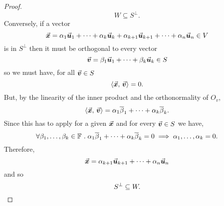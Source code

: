 \documentclass[../MathsNotesBase.tex]{subfiles}
\begin{document}
{\begin{proof}
			\[ W \subseteq S^\perp. \]
			Conversely, if a vector 
			\[ \vec{\bm{x}} = \alpha_1 \vec{\bm{u}}_1 + \cdots + \alpha_k \vec{\bm{u}}_k + \alpha_{k+1} \vec{\bm{u}}_{k+1} + \cdots + \alpha_n \vec{\bm{u}}_n \in V \]
			is in $S^\perp$ then it must be orthogonal to every vector 
			\[ \vec{\bm{v}} = \beta_1 \vec{\bm{u}}_1 + \cdots + \beta_k \vec{\bm{u}}_k \in S \]
			so we must have, for all ${ \vec{\bm{v}} \in S }$
			\[ \langle \vec{\bm{x}},\, \vec{\bm{v}} \rangle = 0. \]
			But, by the linearity of the inner product and the orthonormality of $O_v$,
			\[ \langle \vec{\bm{x}},\, \vec{\bm{v}} \rangle = \alpha_1 \overline{\beta}_1 + \cdots + \alpha_k \overline{\beta}_k. \]
			Since this has to apply for a given $\vec{\bm{x}}$ and for every ${ \vec{\bm{v}} \in S }$ we have,
			\[ \forall \beta_1,\dots,\beta_k \in \mathbb{F}^{} \;.\; \alpha_1 \overline{\beta}_1 + \cdots + \alpha_k \overline{\beta}_k = 0 \implies \alpha_1,\dots,\alpha_k = 0. \]
			Therefore,
			\[ \vec{\bm{x}} = \alpha_{k+1} \vec{\bm{u}}_{k+1} + \cdots + \alpha_n \vec{\bm{u}}_n \]
			and so
			\[ S^\perp \subseteq W. \qedhere \]
		\end{proof}
	
}
\end{document}
